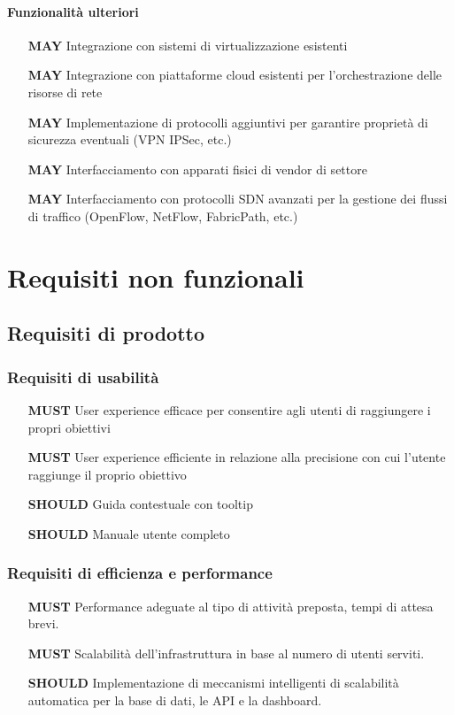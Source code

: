 \documentclass[../main.tex]{subfiles}
\begin{document}
\paragraph{Funzionalità ulteriori}
\begin{itemize}
    \setlength\itemsep{1em}
    \item[\textbf{MAY}] Integrazione con sistemi di virtualizzazione esistenti
    \item[\textbf{MAY}] Integrazione con piattaforme cloud esistenti per l'orchestrazione delle risorse di rete
    \item[\textbf{MAY}] Implementazione di protocolli aggiuntivi per garantire proprietà di sicurezza eventuali (VPN IPSec, etc.)
    \item[\textbf{MAY}] Interfacciamento con apparati fisici di vendor di settore
    \item[\textbf{MAY}] Interfacciamento con protocolli SDN avanzati per la gestione dei flussi di traffico (OpenFlow, NetFlow, FabricPath, etc.)
\end{itemize}

\section{Requisiti non funzionali}
\subsection{Requisiti di prodotto}
\subsubsection{Requisiti di usabilità}
\begin{itemize}
    
    \setlength\itemsep{1em}
    \item[\textbf{MUST}] User experience efficace per consentire agli utenti di raggiungere i propri obiettivi   
    \item[\textbf{MUST}] User experience efficiente in relazione alla precisione con cui l'utente raggiunge il proprio obiettivo
    \item[\textbf{SHOULD}] Guida contestuale con tooltip
    \item[\textbf{SHOULD}] Manuale utente completo
\end{itemize}
\subsubsection{Requisiti  di  efficienza  e  performance}       
\begin{itemize}
    \setlength\itemsep{1em}
    \item[\textbf{MUST}] Performance adeguate al tipo di attività preposta, tempi di attesa brevi.
    \item[\textbf{MUST}] Scalabilità dell'infrastruttura in base al numero di utenti serviti.
    \item[\textbf{SHOULD}] Implementazione di meccanismi intelligenti di scalabilità automatica per la base di dati, le API e la dashboard.
\end{itemize}
\end{document}
